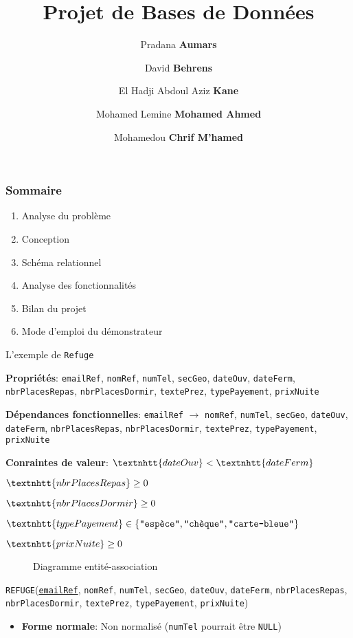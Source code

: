 \documentclass{beamer}
\title{Projet de Bases de Données}
\author{Pradana \textbf{Aumars}
  \and
  David \textbf{Behrens}
  \and
  El Hadji Abdoul Aziz \textbf{Kane}
  \and
  Mohamed Lemine \textbf{Mohamed Ahmed}
  \and
  Mohamedou \textbf{Chrif M'hamed}}
\newcommand\att[1]{\textnhtt{#1}}
\begin{document}
\frame{\titlepage}
\begin{frame}
  \frametitle{Sommaire}
  \begin{enumerate}
  \item Analyse du problème
  \item Conception
  \item Schéma relationnel
  \item Analyse des fonctionnalités
  \item Bilan du projet
  \item Mode d'emploi du démonstrateur
  \end{enumerate}
\end{frame}
\begin{frame}{L'exemple de \att{Refuge}}
  
  \textbf{Propriétés}: 
\att{emailRef}, %
\att{nomRef}, %
\att{numTel}, %
\att{secGeo}, %
\att{dateOuv}, %
\att{dateFerm}, %
\att{nbrPlacesRepas}, %
\att{nbrPlacesDormir}, %
\att{textePrez}, %
\att{typePayement}, %
\att{prixNuite} %

\textbf{Dépendances fonctionnelles}:
\att{emailRef}
$\rightarrow$
\att{nomRef},
\att{numTel},
\att{secGeo},
\att{dateOuv},
\att{dateFerm},
\att{nbrPlacesRepas},
\att{nbrPlacesDormir},
\att{textePrez},
\att{typePayement},
\att{prixNuite}

\textbf{Conraintes de valeur}:
$\att{dateOuv} < \att{dateFerm}$

$\att{nbrPlacesRepas} \geq 0$

$\att{nbrPlacesDormir} \geq 0$

$\att{typePayement} \in \{ \texttt{"espèce"}, \texttt{"chèque"}, \texttt{"carte-bleue"} \}$

$\att{prixNuite} \geq 0$
\end{frame}

\begin{frame}
  \begin{figure}[H]

\caption{Diagramme entité-association}
\end{figure}
\end{frame}

\begin{frame}
  
\att{REFUGE}(\att{\underline{emailRef}}, \att{nomRef}, \att{numTel}, \att{secGeo}, \att{dateOuv}, \att{dateFerm}, \att{nbrPlacesRepas}, \att{nbrPlacesDormir}, \att{textePrez}, \att{typePayement}, \att{prixNuite})
\begin{itemize}
\item \textbf{Forme normale}: Non normalisé (\att{numTel} pourrait être \att{NULL})
\end{itemize}
\end{frame}
\end{document}
